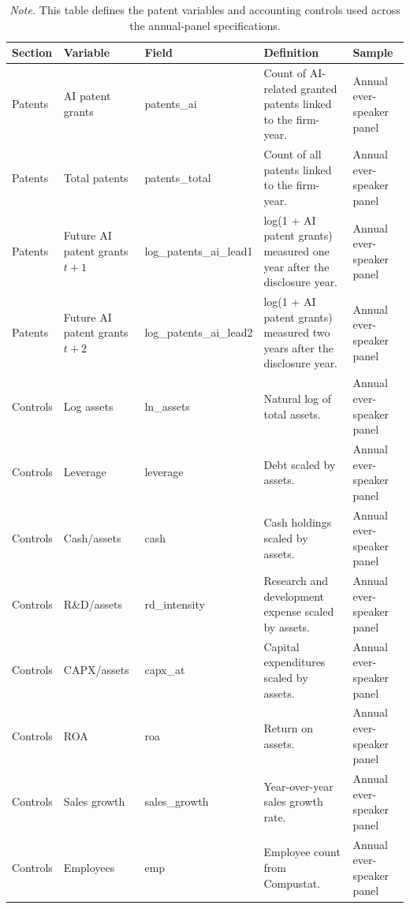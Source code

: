 \begin{table}[p]
\centering
\scriptsize
\setlength{\tabcolsep}{2pt}
\renewcommand{\arraystretch}{1.08}
\caption{Variable definitions: patents and accounting controls}
\label{tab:appendix_var_defs_controls}
\begin{tabularx}{\textwidth}{>{\raggedright\arraybackslash}p{}>{\raggedright\arraybackslash}p{}>{\raggedright\arraybackslash}p{}>{\raggedright\arraybackslash}X>{\raggedright\arraybackslash}p{}}
\hline
Section & Variable & Field & Definition & Sample \\
\hline
Patents & AI patent grants & patents\_\allowbreak{}ai & Count of AI-related granted patents linked to the firm-year. & Annual ever-speaker panel \\
Patents & Total patents & patents\_\allowbreak{}total & Count of all patents linked to the firm-year. & Annual ever-speaker panel \\
Patents & Future AI patent grants $t{+}1$ & log\_\allowbreak{}patents\_\allowbreak{}ai\_\allowbreak{}lead1 & log(1 + AI patent grants) measured one year after the disclosure year. & Annual ever-speaker panel \\
Patents & Future AI patent grants $t{+}2$ & log\_\allowbreak{}patents\_\allowbreak{}ai\_\allowbreak{}lead2 & log(1 + AI patent grants) measured two years after the disclosure year. & Annual ever-speaker panel \\
Controls & Log assets & ln\_\allowbreak{}assets & Natural log of total assets. & Annual ever-speaker panel \\
Controls & Leverage & leverage & Debt scaled by assets. & Annual ever-speaker panel \\
Controls & Cash/assets & cash & Cash holdings scaled by assets. & Annual ever-speaker panel \\
Controls & R\&D/assets & rd\_\allowbreak{}intensity & Research and development expense scaled by assets. & Annual ever-speaker panel \\
Controls & CAPX/assets & capx\_\allowbreak{}at & Capital expenditures scaled by assets. & Annual ever-speaker panel \\
Controls & ROA & roa & Return on assets. & Annual ever-speaker panel \\
Controls & Sales growth & sales\_growth & Year-over-year sales growth rate. & Annual ever-speaker panel \\
Controls & Employees & emp & Employee count from Compustat. & Annual ever-speaker panel \\
\hline
\end{tabularx}
\caption*{\footnotesize \textit{Note.} This table defines the patent variables and accounting controls used across the annual-panel specifications.}
\end{table}

